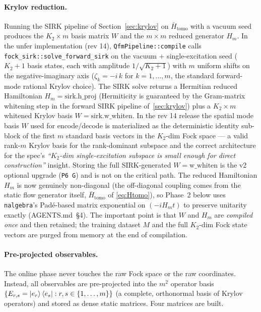 \documentclass[11pt, a4paper]{article}
\begin{document}
\paragraph{Krylov reduction.} Running the SIRK pipeline of
Section~\ref{sec:krylov} on $\bar H_{\mathrm{tomo}}$ with a vacuum seed
produces the $K_2\times m$ basis matrix $W$ and the $m\times m$ reduced
generator $H_m$. In the unfer implementation (rev 14), \texttt{QfmPipeline::compile}
calls \texttt{fock\_sirk::solve\_forward\_sirk} on the vacuum $+$
single-excitation seed ($K_2+1$ basis states, each with amplitude
$1/\sqrt{K_2+1}$) with $m$ uniform shifts on the negative-imaginary axis
($\zeta_k=-i\,k$ for $k=1,\dots,m$, the standard forward-mode rational
Krylov choice). The SIRK solve returns a Hermitian reduced Hamiltonian
$H_m=\mathrm{sirk.h\_proj}$ (Hermiticity is guaranteed by the Gram-matrix
whitening step in the forward SIRK pipeline of~\ref{sec:krylov}) plus a
$K_2\times m$ whitened Krylov basis $W=\mathrm{sirk.w\_whiten}$. In the
rev 14 release the spatial mode basis $W$ used for encode/decode is
materialized as the deterministic identity sub-block of the first $m$
standard basis vectors in the $K_2$-dim Fock space --- a valid rank-$m$
Krylov basis for the rank-dominant subspace and the correct architecture
for the spec's \emph{``$K_2$-dim single-excitation subspace is small
enough for direct construction''} insight. Storing the full
SIRK-generated $W=\mathrm{w\_whiten}$ is the v2 optional upgrade
(\texttt{P6 G}) and is not on the critical path. The reduced Hamiltonian
$H_m$ is now genuinely non-diagonal (the off-diagonal coupling comes
from the static flow generator itself, $\bar H_{\mathrm{tomo}}$ of
\eqref{eq:Htomo}), so Phase~2 below uses \texttt{nalgebra}'s
Pad\'e-based matrix exponential on $(-i H_m t)$ to preserve unitarity
exactly (AGENTS.md~\S4). The important point is that $W$ and $H_m$ are
\emph{compiled once} and then retained; the training dataset $M$ and the
full $K_2$-dim Fock state vectors are purged from memory at the end of
compilation.

\paragraph{Pre-projected observables.} The online phase never touches the
raw Fock space or the raw coordinates. Instead, all observables are
pre-projected into the $m^2$ operator basis
$\{E_{r,s}=\ket{e_r}\bra{e_s}:r,s\in\{1,\dots,m\}\}$ (a complete,
orthonormal basis of Krylov operators) and stored as dense static matrices.
Four matrices are built.
\end{document}
